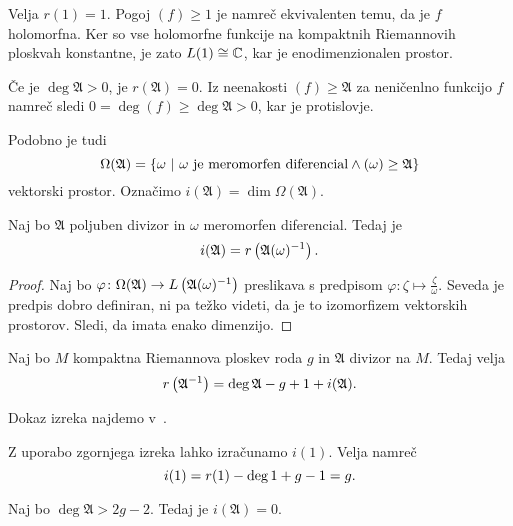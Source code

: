 \begin{zgled}
Velja $r(1) = 1$. Pogoj $(f) \geq 1$ je namreč ekvivalenten temu,
da je $f$ holomorfna. Ker so vse holomorfne funkcije na kompaktnih
Riemannovih ploskvah konstantne, je zato $L(1) \cong \mathbb{C}$, kar je
enodimenzionalen prostor.
\end{zgled}

\begin{zgled}
Če je $\deg \mathfrak{A} > 0$, je $r(\mathfrak{A}) = 0$. Iz
neenakosti $(f) \geq \mathfrak{A}$ za neničenlno funkcijo $f$
namreč sledi $0 = \deg (f) \geq \deg \mathfrak{A} > 0$, kar je
protislovje.
\end{zgled}

Podobno je tudi
\[
\Omega(\mathfrak{A}) =
\left\{\omega~\middle\vert~\text{$\omega$ je meromorfen diferencial} \land
(\omega) \geq \mathfrak{A}\right\}
\]
vektorski prostor. Označimo
$i(\mathfrak{A}) = \dim \Omega(\mathfrak{A})$.

\begin{trditev}\label{td:mero_dif}
Naj bo $\mathfrak{A}$ poljuben divizor in $\omega$ meromorfen
diferencial. Tedaj je
\[
i(\mathfrak{A}) = r \left(\mathfrak{A} (\omega)^{-1}\right).
\]
\end{trditev}

\begin{proof}
Naj bo $\varphi \colon
\Omega(\mathfrak{A}) \to L \left(\mathfrak{A} (\omega)^{-1}\right)$
preslikava s predpisom
$\varphi \colon \zeta \mapsto \frac{\zeta}{\omega}$. Seveda je
predpis dobro definiran, ni pa težko videti, da je to izomorfizem
vektorskih prostorov. Sledi, da imata enako dimenzijo.
\end{proof}

\begin{izrek}
Naj bo $M$ kompaktna Riemannova ploskev roda $g$ in $\mathfrak{A}$
divizor na $M$. Tedaj velja
\[
r \left(\mathfrak{A}^{-1}\right) =
\deg \mathfrak{A} - g + 1 + i(\mathfrak{A}).
\]
\end{izrek}

Dokaz izreka najdemo v~\cite[theorem~III.4.11]{Farkas_Kra_1980}.

\begin{zgled}
Z uporabo zgornjega izreka lahko izračunamo $i(1)$. Velja namreč
\[
i(1) = r(1) - \deg 1 + g - 1 = g. \qedhere
\]
\end{zgled}

\begin{trditev}
Naj bo $\deg \mathfrak{A} > 2g - 2$. Tedaj je
$i(\mathfrak{A}) = 0$.
\end{trditev}

